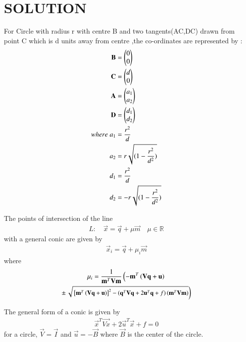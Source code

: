 \documentclass[journal,12pt,twocolumn]{IEEEtran}
\begin{document}
\section*{SOLUTION}
\begin{lemma}
    For Circle with radius r with centre B and two tangents(AC,DC) drawn from point C which is d units away from centre ,the  co-ordinates are represented by :
    \begin{align}
        \mathbf{B} &= \begin{pmatrix}0\\0\end{pmatrix}\\
        \mathbf{C} &= \begin{pmatrix}d\\0\end{pmatrix}\\
        \mathbf{A} &= \begin{pmatrix}a_1\\a_2\end{pmatrix}\\
        \mathbf{D} &= \begin{pmatrix}d_1\\d_2\end{pmatrix}\\
        where\; a_1 &= \dfrac{r^2}{d}\\
        a_2 &= r\sqrt{(1- \dfrac{r^2}{d^2})}\\
        d_1 &= \dfrac{r^2}{d}\\
        d_2 &= -r\sqrt{(1- \dfrac{r^2}{d^2})}\\
    \end{align}
\end{lemma}
\begin{theorem}
  The points of intersection of the line 
\begin{align}
L: \quad \vec{x} = \vec{q} + \mu \vec{m} \quad \mu \in \mathbb{R}
\label{eq:conic_tangent}
\end{align}
with a general conic are given by
\begin{align}
\vec{x}_i = \vec{q} + \mu_i \vec{m}
\end{align}
%
where
\begin{multline}
\mu_i = \frac{1}
{
\mathbf{m}^T\mathbf{V}\mathbf{m}
}
\left(-\mathbf{m}^T\left(\mathbf{V}\mathbf{q}+\mathbf{u}\right)\right.
\\
\pm
{\small
\ensuremath{\left.\sqrt{
{}\left[
\mathbf{m}^T\left(\mathbf{V}\mathbf{q}+\mathbf{u}\right)
\right]^2
-
\left(
\mathbf{q}^T\mathbf{V}\mathbf{q} + 2\mathbf{u}^T\mathbf{q} +f
\right)
\left(\mathbf{m}^T\mathbf{V}\mathbf{m}\right)
}
\right)}
}
\label{eq:tangent_roots}
\end{multline}
\end{theorem}
The general form of a conic is given by
\begin{align}
  \vec{x}^T\vec{Vx}+2\vec{u}^T\vec{x}+f=0 \label{eq:conic}
\end{align}
for a circle, $\vec{V}=\vec{I}$ and $\vec{u}=-\vec{B}$ where $\vec{B}$ is the center of the circle.\\
\end{document}
